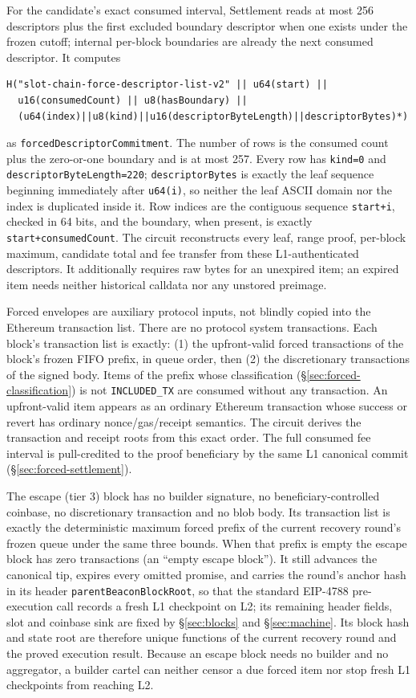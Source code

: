 \documentclass[a4paper,11pt]{article}
\newcommand{\code}[1]{\nolinkurl{#1}}
\begin{document}
For the candidate's exact consumed interval, Settlement reads at most 256
descriptors plus the first excluded boundary descriptor when one exists
under the frozen cutoff; internal per-block boundaries are already the next
consumed descriptor.  It computes
\begin{verbatim}
H("slot-chain-force-descriptor-list-v2" || u64(start) ||
  u16(consumedCount) || u8(hasBoundary) ||
  (u64(index)||u8(kind)||u16(descriptorByteLength)||descriptorBytes)*)
\end{verbatim}
as \code{forcedDescriptorCommitment}.  The number of rows is the consumed
count plus the zero-or-one boundary and is at most 257.  Every row has
\code{kind=0} and \code{descriptorByteLength=220}; \code{descriptorBytes} is
exactly the leaf sequence beginning immediately after \code{u64(i)}, so
neither the leaf ASCII domain nor the index is duplicated inside it.  Row
indices are the contiguous sequence \code{start+i}, checked in 64 bits, and
the boundary, when present, is exactly \code{start+consumedCount}.  The
circuit reconstructs every leaf, range proof, per-block maximum, candidate
total and fee transfer from these L1-authenticated descriptors.  It
additionally requires raw bytes for an unexpired item; an expired item needs
neither historical calldata nor any unstored preimage.

Forced envelopes are auxiliary protocol inputs, not blindly copied into the
Ethereum transaction list.  There are no protocol system transactions.  Each
block's transaction list is exactly: (1) the upfront-valid forced
transactions of the block's frozen FIFO prefix, in queue order, then (2) the
discretionary transactions of the signed body.  Items of the prefix whose
classification (\S\ref{sec:forced-classification}) is not
\code{INCLUDED_TX} are consumed without any transaction.  An upfront-valid
item appears as an ordinary Ethereum transaction whose success or revert has
ordinary nonce/gas/receipt semantics.  The circuit derives the transaction
and receipt roots from this exact order.  The full consumed fee interval is
pull-credited to the proof beneficiary by the same L1 canonical commit
(\S\ref{sec:forced-settlement}).

The escape (tier 3) block has no builder signature, no
beneficiary-controlled coinbase, no discretionary transaction and no blob
body.  Its transaction list is exactly the deterministic maximum forced
prefix of the current recovery round's frozen queue under the same three
bounds.  When that prefix is empty the escape block has zero transactions
(an ``empty escape block'').  It still advances the canonical tip, expires
every omitted promise, and carries the round's anchor hash in its header
\code{parentBeaconBlockRoot}, so that the standard EIP-4788 pre-execution
call records a fresh L1 checkpoint on L2; its remaining header fields, slot
and coinbase sink are fixed by \S\ref{sec:blocks} and \S\ref{sec:machine}.
Its block hash and state root are therefore unique functions of the current
recovery round and the proved execution result.  Because an escape block
needs no builder and no aggregator, a builder cartel can neither censor a
due forced item nor stop fresh L1 checkpoints from reaching L2.
\end{document}
